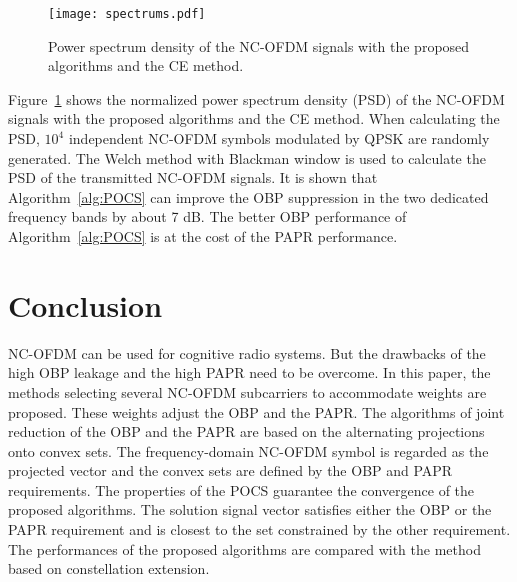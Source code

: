 \documentclass[paper]{ieice}
\begin{document}
\begin{figure}[t]
	\centering
	\texttt{[image: spectrums.pdf]}
	\caption{Power spectrum density of the NC-OFDM signals with the proposed algorithms and the CE method.}
	\label{fig:spectrums}
\end{figure}
Figure~\ref{fig:spectrums} shows the normalized power spectrum density (PSD) of the NC-OFDM
signals with the proposed algorithms and the CE method. When calculating the PSD,  $10^4$ independent NC-OFDM symbols modulated by QPSK are randomly generated. The Welch method with Blackman window is used to calculate the PSD of the transmitted NC-OFDM signals.  It is shown that Algorithm~\ref{alg:POCS} can improve the OBP suppression in the two dedicated frequency bands by about 7 dB. The better OBP performance of Algorithm~\ref{alg:POCS} is at the cost of the PAPR performance.

\section{Conclusion}
\label{sec:conclusion}
NC-OFDM can be used for cognitive radio systems. But the drawbacks of the high OBP leakage and the high PAPR need to be overcome. In this paper, the methods selecting several NC-OFDM subcarriers to accommodate weights are proposed.  These weights adjust the OBP and the PAPR. The algorithms of joint reduction of the OBP and the PAPR are based on the alternating projections onto convex sets. The frequency-domain NC-OFDM symbol is regarded as the projected vector and the convex sets are defined by the OBP and PAPR requirements.  The properties of the POCS guarantee the convergence of the proposed algorithms. The solution signal vector satisfies either the OBP or the PAPR requirement and is closest to the set constrained by the other requirement. The performances of the proposed algorithms are compared with the method based on constellation extension.

%
%
\end{document}
